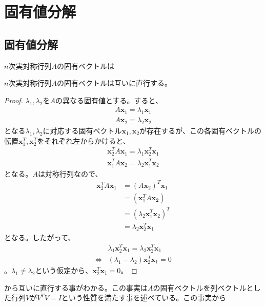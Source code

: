 \section{固有値分解}
\subsection{固有値分解}
$n$次実対称行列$A$の固有ベクトルは
\begin{theorem*}
  $n$次実対称行列$A$の固有ベクトルは互いに直行する。
\end{theorem*}
\begin{proof}
  $\lambda_1,\lambda_2$を$A$の異なる固有値とする。すると、
  \begin{align*}
    A \mathbf{x}_1 = \lambda_1 \mathbf{x}_1 \\
    A \mathbf{x}_2 = \lambda_2 \mathbf{x}_2
  \end{align*}
  となる$\lambda_1, \lambda_2$に対応する固有ベクトル$\mathbf{x}_1, \mathbf{x}_2$が存在するが、この各固有ベクトルの転置$\mathbf{x}_1^T, \mathbf{x}_2^T$をそれぞれ左からかけると、
  \begin{align*}
    \mathbf{x}_2^T A \mathbf{x}_1 = \lambda_1 \mathbf{x}_2^T \mathbf{x}_1 \\
    \mathbf{x}_1^T A \mathbf{x}_2 = \lambda_2 \mathbf{x}_1^T \mathbf{x}_2
  \end{align*}
  となる。$A$は対称行列なので、
  \begin{align*}
    \mathbf{x}_2^T A \mathbf{x}_1 & = (A \mathbf{x}_2)^T \mathbf{x}_1 \\
                                  & = (\mathbf{x}_1^T A \mathbf{x_2}) \\
                                  & = (\lambda_2 \mathbf{x}_1^T \mathbf{x}_2)^T \\
                                  & = \lambda_2 \mathbf{x}_2^T \mathbf{x}_1
  \end{align*}
  となる。したがって、
  \begin{align*}
                    & \lambda_1 \mathbf{x}_2^T \mathbf{x}_1 = \lambda_2 \mathbf{x}_2^T \mathbf{x}_1 \\
    \Leftrightarrow & (\lambda_1 - \lambda_2) \mathbf{x}_2^T \mathbf{x}_1 = 0
  \end{align*}
  。$\lambda_1 \not= \lambda_2$という仮定から、$\mathbf{x}_2^T \mathbf{x}_1 = 0$。
\end{proof}
から互いに直行する事がわかる。この事実は$A$の固有ベクトルを列ベクトルとした行列$V$が$V^T V = I$という性質を満たす事を述べている。この事実から
